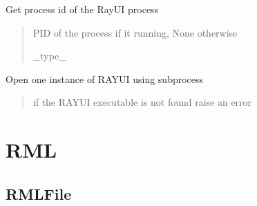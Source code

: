 \documentclass[letterpaper,10pt,english]{sphinxmanual}
\begin{document}
\begin{fulllineitems}
\begin{fulllineitems}
\label{\detokenize{code_documentation:raypyng.runner.RayUIRunner.pid}}
\pysigstartsignatures
{}
\pysigstopsignatures
\sphinxAtStartPar
Get process id of the RayUI process
\begin{quote}\begin{description}
\sphinxAtStartPar
PID of the process if it running, None otherwise

\sphinxAtStartPar
\_type\_

\end{description}\end{quote}

\end{fulllineitems}


\begin{fulllineitems}
\label{\detokenize{code_documentation:raypyng.runner.RayUIRunner.run}}
\pysigstartsignatures
{}
\pysigstopsignatures
\sphinxAtStartPar
Open one instance of RAY\sphinxhyphen{}UI using subprocess
\begin{quote}\begin{description}
\sphinxAtStartPar
{} \textendash{} if the RAY\sphinxhyphen{}UI executable is not found raise an error

\end{description}\end{quote}

\end{fulllineitems}


\end{fulllineitems}



\section{RML}
\label{\detokenize{code_documentation:rml}}

\subsection{RMLFile}
\label{\detokenize{code_documentation:rmlfile}}
\end{document}
